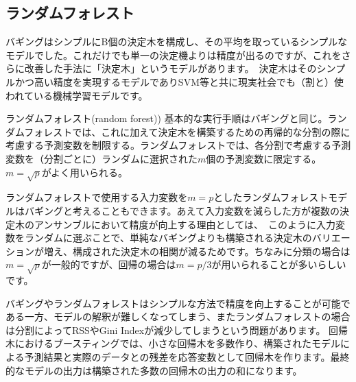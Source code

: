 \documentclass[uplatex]{jsarticle}
\begin{document}
\subsection{ランダムフォレスト}
バギングはシンプルにB個の決定木を構成し、その平均を取っているシンプルなモデルでした。これだけでも単一の決定機よりは精度が出るのですが、これをさらに改善した手法に「決定木」というモデルがあります。\
決定木はそのシンプルかつ高い精度を実現するモデルでありSVM等と共に現実社会でも（割と）使われている機械学習モデルです。
\begin{itembox}[l]{ランダムフォレスト(random forest))}
  基本的な実行手順はバギングと同じ。ランダムフォレストでは、これに加えて決定木を構築するための再帰的な分割の際に考慮する予測変数を制限する。ランダムフォレストでは、各分割で考慮する予測変数を（分割ごとに）ランダムに選択された$m$個の予測変数に限定する。$m = \sqrt{p}$がよく用いられる。
\end{itembox}
ランダムフォレストで使用する入力変数を$m = p$としたランダムフォレストモデルはバギングと考えることもできます。あえて入力変数を減らした方が複数の決定木のアンサンブルにおいて精度が向上する理由としては、\
このように入力変数をランダムに選ぶことで、単純なバギングよりも構築される決定木のバリエーションが増え、構成された決定木の相関が減るためです。ちなみに分類の場合は$m = \sqrt{p}$が一般的ですが、回帰の場合は$m = p/3$が用いられることが多いらしいです。

バギングやランダムフォレストはシンプルな方法で精度を向上することが可能である一方、モデルの解釈が難しくなってしまう、またランダムフォレストの場合は分割によってRSSやGini Indexが減少してしまうという問題があります。
%
回帰木におけるブースティングでは、小さな回帰木を多数作り、構築されたモデルによる予測結果と実際のデータとの残差を応答変数として回帰木を作ります。最終的なモデルの出力は構築された多数の回帰木の出力の和になります。
%
%
\end{document}
